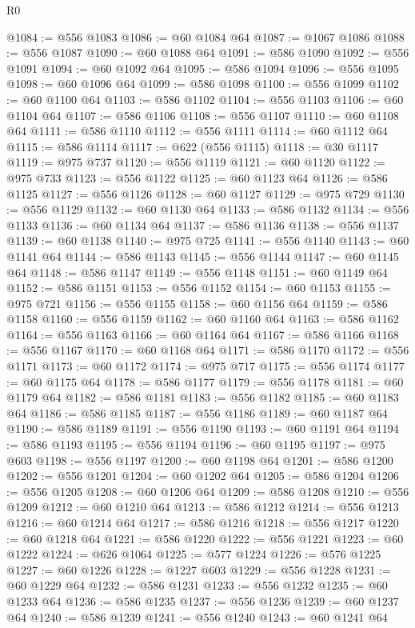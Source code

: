 \begin{lexlean}{R0}
\begin{coremodule}
@1084 := @556 @1083
@1086 := @60 @1084 @64
@1087 := @1067 @1086
@1088 := @556 @1087
@1090 := @60 @1088 @64
@1091 := @586 @1090
@1092 := @556 @1091
@1094 := @60 @1092 @64
@1095 := @586 @1094
@1096 := @556 @1095
@1098 := @60 @1096 @64
@1099 := @586 @1098
@1100 := @556 @1099
@1102 := @60 @1100 @64
@1103 := @586 @1102
@1104 := @556 @1103
@1106 := @60 @1104 @64
@1107 := @586 @1106
@1108 := @556 @1107
@1110 := @60 @1108 @64
@1111 := @586 @1110
@1112 := @556 @1111
@1114 := @60 @1112 @64
@1115 := @586 @1114
@1117 := @622 (@556 @1115)
@1118 := @30 @1117
@1119 := @975 @737
@1120 := @556 @1119
@1121 := @60 @1120
@1122 := @975 @733
@1123 := @556 @1122
@1125 := @60 @1123 @64
@1126 := @586 @1125
@1127 := @556 @1126
@1128 := @60 @1127
@1129 := @975 @729
@1130 := @556 @1129
@1132 := @60 @1130 @64
@1133 := @586 @1132
@1134 := @556 @1133
@1136 := @60 @1134 @64
@1137 := @586 @1136
@1138 := @556 @1137
@1139 := @60 @1138
@1140 := @975 @725
@1141 := @556 @1140
@1143 := @60 @1141 @64
@1144 := @586 @1143
@1145 := @556 @1144
@1147 := @60 @1145 @64
@1148 := @586 @1147
@1149 := @556 @1148
@1151 := @60 @1149 @64
@1152 := @586 @1151
@1153 := @556 @1152
@1154 := @60 @1153
@1155 := @975 @721
@1156 := @556 @1155
@1158 := @60 @1156 @64
@1159 := @586 @1158
@1160 := @556 @1159
@1162 := @60 @1160 @64
@1163 := @586 @1162
@1164 := @556 @1163
@1166 := @60 @1164 @64
@1167 := @586 @1166
@1168 := @556 @1167
@1170 := @60 @1168 @64
@1171 := @586 @1170
@1172 := @556 @1171
@1173 := @60 @1172
@1174 := @975 @717
@1175 := @556 @1174
@1177 := @60 @1175 @64
@1178 := @586 @1177
@1179 := @556 @1178
@1181 := @60 @1179 @64
@1182 := @586 @1181
@1183 := @556 @1182
@1185 := @60 @1183 @64
@1186 := @586 @1185
@1187 := @556 @1186
@1189 := @60 @1187 @64
@1190 := @586 @1189
@1191 := @556 @1190
@1193 := @60 @1191 @64
@1194 := @586 @1193
@1195 := @556 @1194
@1196 := @60 @1195
@1197 := @975 @603
@1198 := @556 @1197
@1200 := @60 @1198 @64
@1201 := @586 @1200
@1202 := @556 @1201
@1204 := @60 @1202 @64
@1205 := @586 @1204
@1206 := @556 @1205
@1208 := @60 @1206 @64
@1209 := @586 @1208
@1210 := @556 @1209
@1212 := @60 @1210 @64
@1213 := @586 @1212
@1214 := @556 @1213
@1216 := @60 @1214 @64
@1217 := @586 @1216
@1218 := @556 @1217
@1220 := @60 @1218 @64
@1221 := @586 @1220
@1222 := @556 @1221
@1223 := @60 @1222
@1224 := @626 @1064
@1225 := @577 @1224
@1226 := @576 @1225
@1227 := @60 @1226
@1228 := @1227 @603
@1229 := @556 @1228
@1231 := @60 @1229 @64
@1232 := @586 @1231
@1233 := @556 @1232
@1235 := @60 @1233 @64
@1236 := @586 @1235
@1237 := @556 @1236
@1239 := @60 @1237 @64
@1240 := @586 @1239
@1241 := @556 @1240
@1243 := @60 @1241 @64

\end{coremodule}
\end{lexlean}
